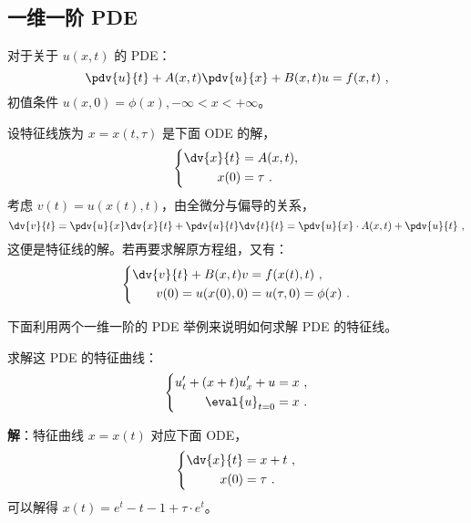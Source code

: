 \subsection{一维一阶 PDE}
\begin{theorem}{}
对于关于 $u(x, t)$ 的 PDE：
\begin{equation}
\pdv{u}{t} + A(x, t) \pdv{u}{x} + B(x, t) u = f(x, t) ~,
\end{equation}
初值条件 $u(x, 0) = \phi(x), -\infty < x < +\infty$。

设特征线族为 $x = x(t, \tau)$ 是下面 ODE 的解，
\begin{equation}
\left\{
\begin{aligned}
\dv{x}{t} &= A(x, t), \\
x(0) &= \tau ~.
\end{aligned}
\right .
\end{equation}
考虑 $v(t) = u(x(t), t)$，由全微分与偏导的关系，
$$\dv{v}{t} = \pdv{u}{x} \dv{x}{t} + \pdv{u}{t} \dv{t}{t} = \pdv{u}{x} \cdot A(x, t) + \pdv{u}{t} ~,$$
这便是特征线的解。若再要求解原方程组，又有：
\begin{equation}
\left\{
\begin{aligned}
\dv{v}{t} + B(x, t) v &= f(x(t), t) ~, \\
v(0) = u(x(0), 0) &= u(\tau, 0) = \phi(x) ~.
\end{aligned}
\right.
\end{equation}
\end{theorem}











下面利用两个一维一阶的 PDE 举例来说明如何求解 PDE 的特征线。
\begin{example}{}
求解这 PDE 的特征曲线：
\begin{equation}
\left \{ 
\begin{aligned}
u'_t + (x + t) u'_x + u &= x ~, \\
\eval{u}_{t=0} &= x ~.
\end{aligned}
\right .
\end{equation}

\textbf{解}：特征曲线 $x=x(t)$ 对应下面 ODE，
\begin{equation}
\left \{ 
\begin{aligned}
\dv{x}{t} &= x+t ~, \\
x(0) &= \tau ~.
\end{aligned}
\right .
\end{equation}
可以解得 $x(t) = e^t - t - 1 + \tau \cdot e^t$。
\end{example}









